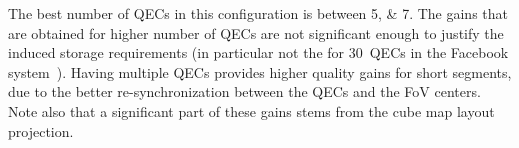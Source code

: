 The best number of \acp{QEC} in this configuration is between
\numlist{5;7}. The gains that are obtained for higher number of
\acp{QEC} are not significant enough to justify the induced storage
requirements (in particular not the for $30$~\acp{QEC} in the Facebook
system~\cite{facebook}). Having multiple  \acp{QEC} provides higher
quality gains for short segments, due to the better re-synchronization
between the \acp{QEC} and the \ac{FoV} centers. Note also that a
significant part of these gains stems from the cube map layout
projection.
%
